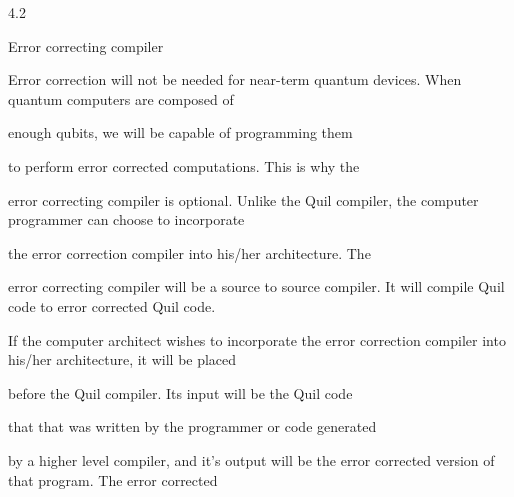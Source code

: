 \documentclass[a4paper,portrait,12pt]{article}
\begin{document}
4.2





\begin{flushleft}
Error correcting compiler
\end{flushleft}





\begin{flushleft}
Error correction will not be needed for near-term quantum devices. When quantum computers are composed of
\end{flushleft}


\begin{flushleft}
enough qubits, we will be capable of programming them
\end{flushleft}


\begin{flushleft}
to perform error corrected computations. This is why the
\end{flushleft}


\begin{flushleft}
error correcting compiler is optional. Unlike the Quil compiler, the computer programmer can choose to incorporate
\end{flushleft}


\begin{flushleft}
the error correction compiler into his/her architecture. The
\end{flushleft}


\begin{flushleft}
error correcting compiler will be a source to source compiler. It will compile Quil code to error corrected Quil code.
\end{flushleft}


\begin{flushleft}
If the computer architect wishes to incorporate the error correction compiler into his/her architecture, it will be placed
\end{flushleft}


\begin{flushleft}
before the Quil compiler. Its input will be the Quil code
\end{flushleft}


\begin{flushleft}
that that was written by the programmer or code generated
\end{flushleft}


\begin{flushleft}
by a higher level compiler, and it's output will be the error corrected version of that program. The error corrected
\end{flushleft}
\end{document}
